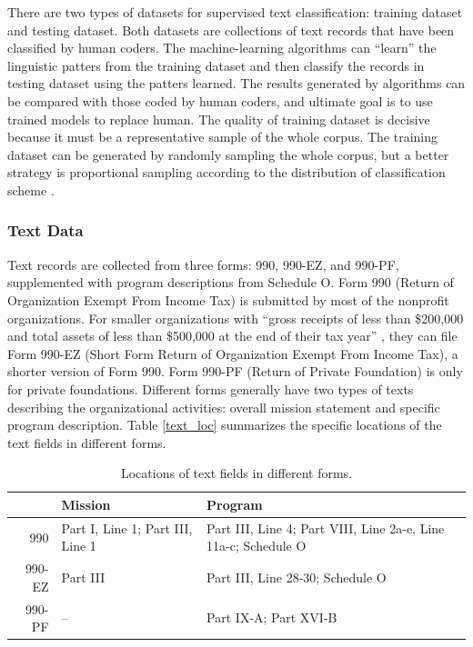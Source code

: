 \documentclass[12pt]{article}
\begin{document}
There are two types of datasets for supervised text classification: training dataset and testing dataset. Both datasets are collections of text records that have been classified by human coders. The machine-learning algorithms can ``learn'' the linguistic patters from the training dataset and then classify the records in testing dataset using the patters learned. The results generated by algorithms can be compared with those coded by human coders, and ultimate goal is to use trained models to replace human. The quality of training dataset is decisive because it must be a representative sample of the whole corpus. The training dataset can be generated by randomly sampling the whole corpus, but a better strategy is proportional sampling according to the distribution of classification scheme \parencite[278]{GrimmerTextDataPromise2013}.

\subsubsection{Text Data}

Text records are collected from three forms: 990, 990-EZ, and 990-PF, supplemented with program descriptions from Schedule O. Form 990 (Return of Organization Exempt From Income Tax) is submitted by most of the nonprofit organizations. For smaller organizations with ``gross receipts of less than \$200,000 and total assets of less than \$500,000 at the end of their tax year'' \parencite[1]{USInternalRevenueService2017InstructionsForm2018}, they can file Form 990-EZ (Short Form Return of Organization Exempt From Income Tax), a shorter version of Form 990. Form 990-PF (Return of Private Foundation) is only for private foundations. Different forms generally have two types of texts describing the organizational activities: overall mission statement and specific program description. Table \ref{text_loc} summarizes the specific locations of the text fields in different forms.

\begin{table}[]
    \centering
    \begin{tabularx}{\textwidth}{r|X|X}
         & Mission & Program \\
         \hline
         990 & Part I, Line 1; Part III, Line 1 & Part III, Line 4; Part VIII, Line 2a-e, Line 11a-c; Schedule O \\
         990-EZ & Part III & Part III, Line 28-30; Schedule O \\
         990-PF & -- & Part IX-A; Part XVI-B \\
    \end{tabularx}
    \caption{Locations of text fields in different forms.} \label{text_loc}
    \label{tab:my_label}
\end{table}
\end{document}
